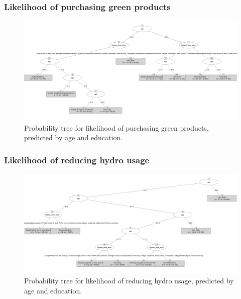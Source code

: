 \documentclass[
  letterpaper,
  DIV=11,
  numbers=noendperiod]{scrartcl}
\begin{document}
\subsubsection{Likelihood of purchasing green
products}\label{likelihood-of-purchasing-green-products}

\begin{figure}[H]

{\centering \includegraphics[width=10.67in,height=\textheight]{../data/04-model_data/green_product_tree.png}

}

\caption{Probability tree for likelihood of purchasing green products,
predicted by age and education.}

\end{figure}%

\subsubsection{Likelihood of reducing hydro
usage}\label{likelihood-of-reducing-hydro-usage}

\begin{figure}[H]

{\centering \includegraphics[width=10.67in,height=\textheight]{../data/04-model_data/reduce_hydro_tree.png}

}

\caption{Probability tree for likelihood of reducing hydro usage,
predicted by age and education.}

\end{figure}%
\end{document}
